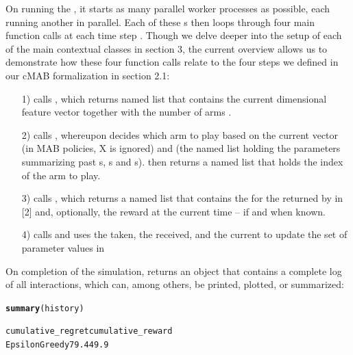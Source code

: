 \documentclass[nojss]{jss}\usepackage[]{graphicx}\usepackage[]{color}
\makeatletter
\newcommand{\hlkwd}[1]{\textcolor[rgb]{0.737,0.353,0.396}{\textbf{#1}}}%
\newenvironment{kframe}{%
 \def\at@end@of@kframe{}%
 \ifinner\ifhmode%
  \def\at@end@of@kframe{\end{minipage}}%
  \begin{minipage}{\columnwidth}%
 \fi\fi%
 \def\FrameCommand##1{\hskip\@totalleftmargin \hskip-\fboxsep
 \colorbox{shadecolor}{##1}\hskip-\fboxsep
     \hskip-\linewidth \hskip-\@totalleftmargin \hskip\columnwidth}%
 \MakeFramed {\advance\hsize-\width
   \@totalleftmargin\z@ \linewidth\hsize
   \@setminipage}}%
 {\par\unskip\endMakeFramed%
 \at@end@of@kframe}
\newenvironment{knitrout}{}{} %
\makeatother
\begin{document}
On running the , it starts as many parallel worker processes as possible, each running another  in parallel. Each of these s then loops through four main function calls at each time step . Though we delve deeper into the setup of each of the main contextual classes in section 3, the current overview allows us to demonstrate how these four function calls relate to the four steps we defined in our cMAB formalization in section 2.1:

\begin{enumerate}
         \item[1)]  calls , which returns named list  that contains the current  dimensional  feature vector  together with the number of arms .
         \item[2)]  calls , whereupon  decides which arm to play based on the current  vector  (in MAB policies, X is ignored) and  (the named list holding the parameters summarizing past s, s and s\footnotemark[\value{footnote}]).  then returns a named list  that holds the index of the arm to play.
         \item[3)]  calls , which returns a named list  that contains the  for the  returned by  in [2] and, optionally, the  reward at the current time  -- if and when known.
         \item[4)]  calls  and uses the  taken, the  received, and the current  to update the set of parameter values in 
\end{enumerate}

On completion of the simulation,  returns an  object that contains a complete log of all interactions, which can, among others, be printed, plotted, or summarized:

\begin{knitrout}\small
{}\color{fgcolor}\begin{kframe}
\begin{alltt}
\hlkwd{summary}(history)

                cumulative_regret cumulative_reward
EpsilonGreedy   79.44             9.9
\end{alltt}
\end{kframe}
\end{knitrout}
\end{document}
